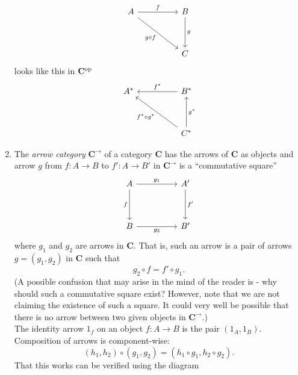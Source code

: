 \begin{enumerate}
	\begin{equation*} 
		\begin{tikzcd}
			A \arrow[rr, "f"] \arrow[rrdd, "g\circ f"'] && B \arrow[dd, "g"]\\
			&&\\
			&& C
		\end{tikzcd}
	\end{equation*}
	looks like this in $\mathbf{C}^{\operatorname{op}}$
	\begin{equation*} 
		\begin{tikzcd}
			A^* && \arrow[ll, "f^*"'] B^* \\
			&&\\
			&& \arrow[lluu, "f^*\circ g^*"]\arrow[uu, "g^*"'] C^*
		\end{tikzcd}
	\end{equation*}
	\item The \emph{arrow category} $\mathbf{C}^\to$ of a category $\mathbf{C}$ has the arrows of $\mathbf{C}$ as objects and arrow $g$ from $f:A\to B$ to $f':A\to B'$ in $\mathbf{C}^\to$ is a ``commutative square''
	\begin{equation*} 
		\begin{tikzcd}
		A \arrow[dd, "f"'] \arrow[rr, "g_1"] &  & A' \arrow[dd, "f'"] \\
		                                     &  &                     \\
		B \arrow[rr, "g_2"']                 &  & B'                 
		\end{tikzcd}
	\end{equation*}
	where $g_1$ and $g_2$ are arrows in $\mathbf{C}.$ That is, such an arrow is a pair of arrows $g = (g_1, g_2)$ in $\mathbf{C}$ such that
	\begin{equation*} 
		g_2\circ f = f'\circ g_1.
	\end{equation*}
	(A possible confusion that may arise in the mind of the reader is - why should such a commutative square exist? However, note that we are not claiming the existence of such a square. It could very well be possible that there is no arrow between two given objects in $\mathbf{C}^\to$.)\\
	The identity arrow $1_f$ on an object $f:A\to B$ is the pair $(1_A, 1_B).$\\
	Composition of arrows is component-wise:
	\begin{equation*} 
		(h_1, h_2)\circ (g_1, g_2) = (h_1\circ g_1, h_2\circ g_2).
	\end{equation*}
	That this works can be verified using the diagram

\end{enumerate}
